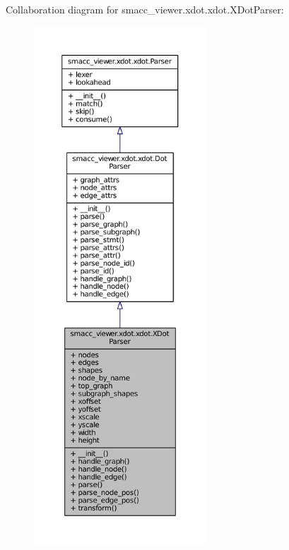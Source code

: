 Collaboration diagram for smacc\+\_\+viewer.\+xdot.\+xdot.\+X\+Dot\+Parser\+:
\nopagebreak
\begin{figure}[H]
\begin{center}
\leavevmode
\includegraphics[height=550pt]{classsmacc__viewer_1_1xdot_1_1xdot_1_1XDotParser__coll__graph}
\end{center}
\end{figure}
